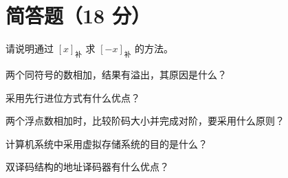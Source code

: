 \documentclass[fontset=exam]{exam-zh}
\begin{document}
\section{简答题（18 分）}
\begin{question}[index=1]
请说明通过 \([x]_{\text{补}}\) 求 \([-x]_{\text{补}}\) 的方法。
\end{question}
\begin{question}[index=2]
两个同符号的数相加，结果有溢出，其原因是什么？
\end{question}
\begin{question}[index=3]
采用先行进位方式有什么优点？
\end{question}
\begin{question}[index=4]
两个浮点数相加时，比较阶码大小并完成对阶，要采用什么原则？
\end{question}
\begin{question}[index=5]
计算机系统中采用虚拟存储系统的目的是什么？
\end{question}
\begin{question}[index=6]
双译码结构的地址译码器有什么优点？
\end{question}
\end{document}
